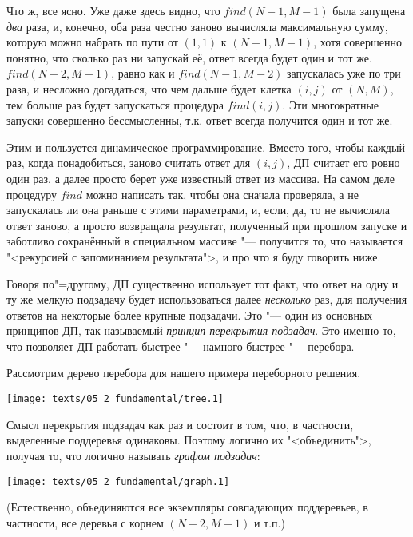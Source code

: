\vspace{0.2cm plus 0.1cm}

Что ж, все ясно. Уже даже здесь видно, что $find(N-1,M-1)$ была запущена \textit{два} раза, и, 
конечно, оба раза честно заново вычисляла максимальную сумму, которую можно набрать по пути от 
$(1,1)$ к $(N-1,M-1)$, хотя совершенно понятно, что сколько раз ни запускай её, ответ всегда будет 
один и тот же. $find(N-2,M-1)$, равно как и $find(N-1,M-2)$ запускалась уже по три раза, и несложно 
догадаться, что чем дальше будет клетка $(i,j)$ от $(N,M)$, тем больше раз будет запускаться 
процедура $find(i,j)$. Эти многократные запуски совершенно бессмысленны, т.к. ответ всегда 
получится один и тот же.

Этим и пользуется динамическое программирование. Вместо того, чтобы каждый раз, когда понадобиться, 
заново считать ответ для $(i,j)$, ДП считает его ровно один раз, а далее просто берет уже известный 
ответ из массива. {\footnotesize На самом деле процедуру $find$ можно написать так, чтобы она 
сначала проверяла, а не запускалась ли она раньше с этими параметрами, и, если, да, то не вычисляла 
ответ заново, а просто возвращала результат, полученный при прошлом запуске и заботливо сохранённый 
в специальном массиве "--- получится то, что называется "<рекурсией с запоминанием результата">, и 
про что я буду говорить ниже.}

Говоря по"=другому, ДП существенно использует тот факт, что ответ на одну и ту же мелкую подзадачу 
будет использоваться далее \textit{несколько} раз, для получения ответов на некоторые более крупные 
подзадачи. Это "--- один из основных принципов ДП, так называемый \textit{принцип перекрытия 
подзадач}. Это именно то, что позволяет ДП работать быстрее "--- намного быстрее "--- перебора.

Рассмотрим дерево перебора для нашего примера переборного решения.

\begin{center}\texttt{[image: texts/05\_2\_fundamental/tree.1]}\end{center}

Смысл перекрытия подзадач как раз и состоит в том, что, в частности, выделенные поддеревья 
одинаковы. Поэтому логично их "<объединить">, получая то, что логично называть \textit{графом 
подзадач}:
\begin{center}\texttt{[image: texts/05\_2\_fundamental/graph.1]}\end{center}

(Естественно, объединяются все экземпляры совпадающих поддеревьев, в частности, все деревья с корнем 
$(N-2,M-1)$ и т.п.)

